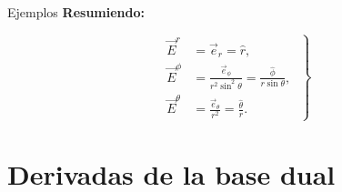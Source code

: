 \documentclass[../apunte_mecanica_clasica.tex]{subfiles}%
\begin{document}
\begin{apuntebloque}{Ejemplos}
\textbf{Resumiendo:}

\begin{equation*}
\left.
\begin{aligned}
    \vec{E}^r     &= \vec{e}_r = \hat{r}, \\[6pt]
    \vec{E}^\phi  &= \frac{\vec{e}_\phi}{r^2 \sin^2\theta} = \frac{\hat{\phi}}{r \sin\theta}, \\[6pt]
    \vec{E}^\theta &= \frac{\vec{e}_\theta}{r^2} = \frac{\hat{\theta}}{r}.
\end{aligned}
\;\right\}
\end{equation*}

\end{apuntebloque}


\newpage

\section{Derivadas de la base dual}
\end{document}
